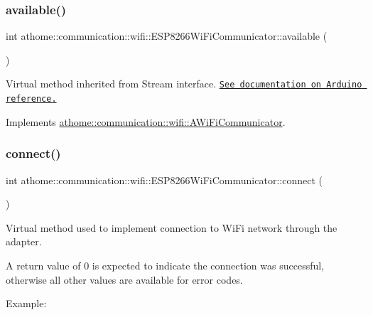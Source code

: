 \subsubsection{\texorpdfstring{available()}{available()}}
{\footnotesize\ttfamily int athome\+::communication\+::wifi\+::\+E\+S\+P8266\+Wi\+Fi\+Communicator\+::available (\begin{DoxyParamCaption}{ }\end{DoxyParamCaption})\hspace{0.3cm}{\ttfamily [virtual]}}

Virtual method inherited from Stream interface. \href{https://www.arduino.cc/reference/en/language/functions/communication/stream/streamavailable/}{\tt See documentation on Arduino reference.} 

Implements \mbox{\hyperlink{classathome_1_1communication_1_1wifi_1_1_a_wi_fi_communicator_ab71f3c62a890abdefe549d69b40b12ba}{athome\+::communication\+::wifi\+::\+A\+Wi\+Fi\+Communicator}}.

\mbox{\label{classathome_1_1communication_1_1wifi_1_1_e_s_p8266_wi_fi_communicator_a58cc439be2f368b346bbbe1601a9b675}} 
\subsubsection{\texorpdfstring{connect()}{connect()}}
{\footnotesize\ttfamily int athome\+::communication\+::wifi\+::\+E\+S\+P8266\+Wi\+Fi\+Communicator\+::connect (\begin{DoxyParamCaption}{ }\end{DoxyParamCaption})\hspace{0.3cm}{\ttfamily [virtual]}}

Virtual method used to implement connection to Wi\+Fi network through the adapter.

A return value of 0 is expected to indicate the connection was successful, otherwise all other values are available for error codes.

Example\+:


